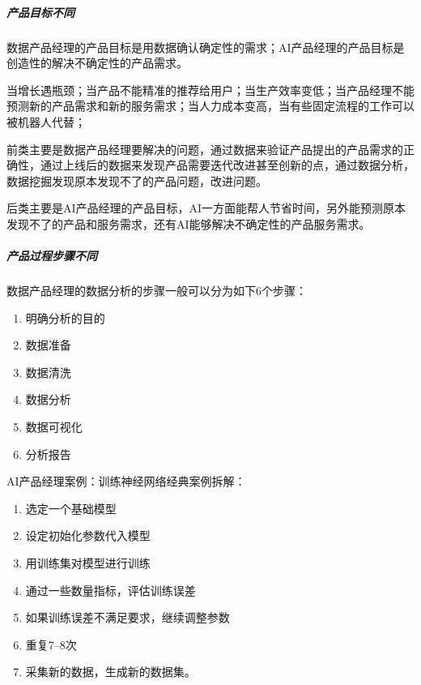 \documentclass[letterpaper,10pt,english]{sphinxmanual}
\begin{document}
\subparagraph{产品目标不同}
\label{\detokenize{chapter_introduction/AI_PM:id18}}
数据产品经理的产品目标是用数据确认确定性的需求；AI产品经理的产品目标是创造性的解决不确定性的产品需求。

当增长遇瓶颈；当产品不能精准的推荐给用户；当生产效率变低；当产品经理不能预测新的产品需求和新的服务需求；当人力成本变高，当有些固定流程的工作可以被机器人代替；

前类主要是数据产品经理要解决的问题，通过数据来验证产品提出的产品需求的正确性，通过上线后的数据来发现产品需要迭代改进甚至创新的点，通过数据分析，数据挖掘发现原本发现不了的产品问题，改进问题。

后类主要是AI产品经理的产品目标，AI一方面能帮人节省时间，另外能预测原本发现不了的产品和服务需求，还有AI能够解决不确定性的产品服务需求。


\subparagraph{产品过程步骤不同}
\label{\detokenize{chapter_introduction/AI_PM:id19}}
数据产品经理的数据分析的步骤一般可以分为如下6个步骤：
\begin{enumerate}
%
\item {} 
明确分析的目的

\item {} 
数据准备

\item {} 
数据清洗

\item {} 
数据分析

\item {} 
数据可视化

\item {} 
分析报告

\end{enumerate}

AI产品经理案例：训练神经网络经典案例拆解：
\begin{enumerate}
%
\item {} 
选定一个基础模型

\item {} 
设定初始化参数代入模型

\item {} 
用训练集对模型进行训练

\item {} 
通过一些数量指标，评估训练误差

\item {} 
如果训练误差不满足要求，继续调整参数

\item {} 
重复7–8次

\item {} 
采集新的数据，生成新的数据集。

\end{enumerate}
\end{document}
